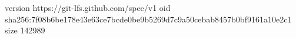 version https://git-lfs.github.com/spec/v1
oid sha256:7f08b6be178e43e63ce7bcde0be9b5269d7c9a50cebab8457b0bf9161a10e2c1
size 142989
